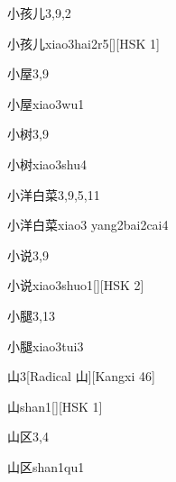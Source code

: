 \begin{entry}{小孩儿}{3,9,2}
  \begin{phonetics}{小孩儿}{xiao3hai2r5}[][HSK 1]
  \end{phonetics}
\end{entry}

\begin{entry}{小屋}{3,9}
  \begin{phonetics}{小屋}{xiao3wu1}
  \end{phonetics}
\end{entry}

\begin{entry}{小树}{3,9}
  \begin{phonetics}{小树}{xiao3shu4}
  \end{phonetics}
\end{entry}

\begin{entry}{小洋白菜}{3,9,5,11}
  \begin{phonetics}{小洋白菜}{xiao3 yang2bai2cai4}
  \end{phonetics}
\end{entry}

\begin{entry}{小说}{3,9}
  \begin{phonetics}{小说}{xiao3shuo1}[][HSK 2]
  \end{phonetics}
\end{entry}

\begin{entry}{小腿}{3,13}
  \begin{phonetics}{小腿}{xiao3tui3}
  \end{phonetics}
\end{entry}

\begin{entry}{山}{3}[Radical 山][Kangxi 46]
  \begin{phonetics}{山}{shan1}[][HSK 1]
  \end{phonetics}
\end{entry}

\begin{entry}{山区}{3,4}
  \begin{phonetics}{山区}{shan1qu1}
  \end{phonetics}
\end{entry}

